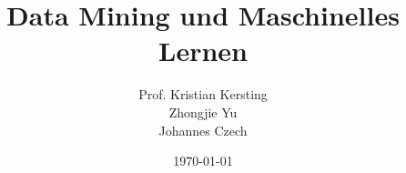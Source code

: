 \documentclass[
	ngerman,
	colorback=false,
	solution=true,
	]{tudaexercise}
\def\homework{1}
\begin{document}
\title[Bonusübungsblatt \homework, Data Mining und Maschinelles Lernen]{Data Mining und Maschinelles Lernen}
\author{Prof. Kristian Kersting\\Zhongjie Yu\\Johannes Czech\\
}
\date{\today}
\sheetnumber{\homework}
\setcounter{section}{\homework}

\maketitle



\newpage

\newpage



\newpage

\newpage

\newpage

\newpage


%
\end{document}
